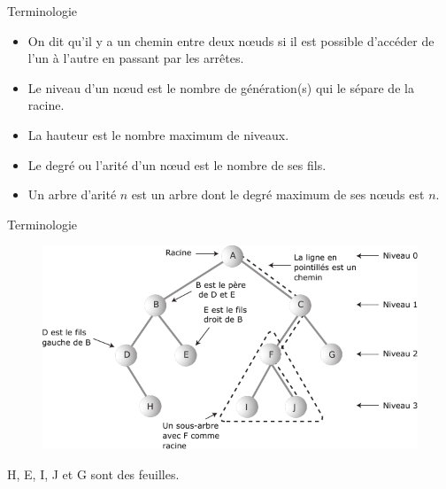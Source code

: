 \documentclass[12pt,a4paper]{beamer}
\newcommand{\hl}[1]{\textcolor{blueemph}{#1}}
\begin{document}
\begin{frame}{Terminologie}{}

\begin{itemize}
\item On dit qu'il y a un \hl{chemin} entre deux n\oe uds si il est possible d’accéder de l'un à l'autre en passant par les arrêtes.
\item Le \hl{niveau} d'un n\oe ud est le nombre de génération(s) qui le sépare de la racine.
\item La \hl{hauteur} est le nombre maximum de niveaux.
\item Le \hl{degré} ou l'\hl{arité} d'un n\oe ud est le nombre de ses fils.
\item Un arbre d'arité $n$ est un arbre dont le degré maximum de ses n\oe uds est $n$.
\end{itemize}

\end{frame}

\begin{frame}{Terminologie}{}
\begin{figure}
\includegraphics[scale=1]{figs/tree}
\end{figure}
H, E, I, J et G sont des feuilles.

\end{frame}
\end{document}
